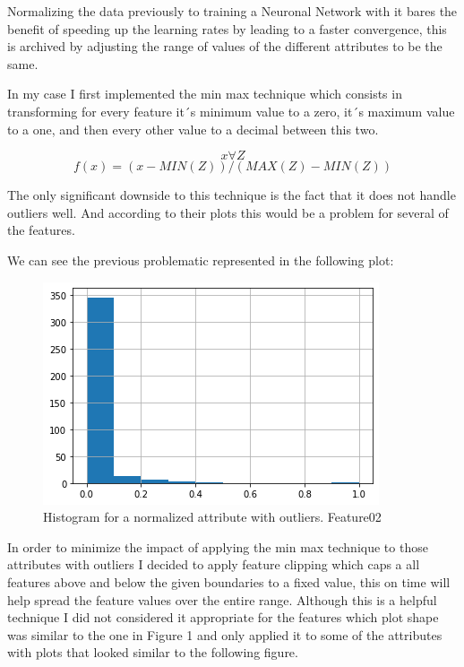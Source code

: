 \documentclass[12pt, a4paper]{article}
\begin{document}
	Normalizing the data previously to training a Neuronal Network with it bares the benefit of speeding up the learning rates by leading to a faster convergence, this is archived by adjusting the range of values of the different attributes to be the same.\cite{normalization}
	
	In my case I first implemented the min max technique which consists in transforming for every feature it´s minimum value to a zero, it´s maximum value to a one, and then every other value to a decimal between this two.\cite{normalizationTechniques}
	
	\[ x \forall Z \]
	\[ f(x) = (x - MIN(Z))/(MAX(Z)-MIN(Z)) \]
	
	The only significant downside to this technique is the fact that it does not handle outliers well. And according to their plots this would be a problem for several of the features.
	
	We can see the previous problematic represented in the following plot:
	
	\begin{figure}[h]
		\label{Feature02N}
		\includegraphics{img/plots/feature02N.png}
		\caption{Histogram for a normalized attribute with outliers. Feature02}
	\end{figure}
	
	In order to minimize the impact of applying the min max technique to those attributes with outliers I decided to apply feature clipping which caps a all features above and below the given boundaries to a fixed value, this on time will help spread the feature values over the entire range. Although this is a helpful technique I did not considered it appropriate for the features which plot shape was similar to the one in Figure 1 and only applied it to some of the attributes with plots that looked similar to the following figure.
	
\end{document}
